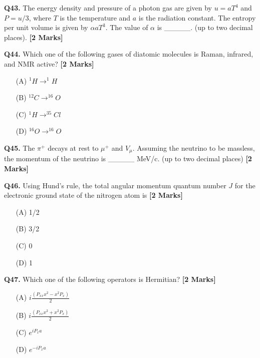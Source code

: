 \documentclass[11pt]{article}
\newcommand{\questionb}[2]{
    \noindent\textbf{Q#2.} #1 \hfill \textbf{[2 Marks]}
}
\begin{document}
\questionb{The energy density and pressure of a photon gas are given by \( u = aT^4 \) and \( P = u/3 \), where \( T \) is the temperature and \( a \) is the radiation constant. The entropy per unit volume is given by \( \alpha aT^3 \). The value of \( \alpha \) is \_\_\_\_\_. (up to two decimal places).}{43}
\vspace{0.5cm}

\questionb{Which one of the following gases of diatomic molecules is Raman, infrared, and NMR active?}{44}
\begin{enumerate}
    \item[(A)] \( ^1H \rightarrow ^1H \)
    \item[(B)] \( ^{12}C \rightarrow ^{16}O \)
    \item[(C)] \( ^1H \rightarrow ^{35}Cl \)
    \item[(D)] \( ^{16}O \rightarrow ^{16}O \)
\end{enumerate}
\vspace{0.5cm}

\questionb{The \( \pi^+ \) decays at rest to \( \mu^+ \) and \( V_\mu \). Assuming the neutrino to be massless, the momentum of the neutrino is \_\_\_\_\_ MeV/c. (up to two decimal places)}{45}
\vspace{0.5cm}

\questionb{Using Hund's rule, the total angular momentum quantum number \( J \) for the electronic ground state of the nitrogen atom is}{46}
\begin{enumerate}
    \item[(A)] 1/2
    \item[(B)] 3/2
    \item[(C)] 0
    \item[(D)] 1
\end{enumerate}
\vspace{0.5cm}

\questionb{Which one of the following operators is Hermitian?}{47}
\begin{enumerate}
    \item[(A)] \( i \frac{(P_{xx} x^2 - x^2 P_x)}{2} \)
    \item[(B)] \( i \frac{(P_{xx} x^2 + x^2 P_x)}{2} \)
    \item[(C)] \( e^{i P_x a} \)
    \item[(D)] \( e^{-i P_x a} \)
\end{enumerate}
\vspace{0.5cm}
\end{document}
